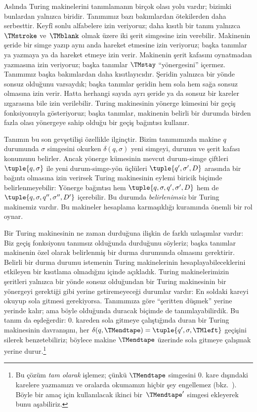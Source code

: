 


Aslında Turing makinelerini tanımlamanın birçok olası yolu vardır; bizimki
bunlardan yalnızca biridir. Tanımımız bazı bakımlardan ötekilerden daha
serbesttir. Keyfî sonlu alfabelere izin veriyoruz; daha kısıtlı bir tanım
yalnızca $\TMstroke$ ve~$\TMblank$ olmak üzere iki şerit simgesine izin
verebilir. Makinenin şeride bir simge yazıp aynı anda hareket etmesine izin
veriyoruz; başka tanımlar ya yazmaya ya da hareket etmeye izin verir.
Makinenin şerit kafasını oynatmadan yazmasına izin veriyoruz; başka tanımlar
$\TMstay$ ``yönergesini'' içermez. Tanımımız başka bakımlardan daha
kısıtlayıcıdır. Şeridin yalnızca bir yönde sonsuz olduğunu varsaydık; başka
tanımlar şeridin hem sola hem sağa sonsuz olmasına izin verir. Hatta herhangi
sayıda ayrı şeride ya da sonsuz bir kareler ızgarasına bile izin verilebilir.
Turing makinesinin yönerge kümesini bir geçiş fonksiyonuyla gösteriyoruz;
başka tanımlar, makinenin belirli bir durumda birden fazla olası yönergeye
sahip olduğu bir geçiş bağıntısı kullanır.

Tanımın bu son gevşetilişi özellikle ilginçtir. Bizim tanımımızda makine
$q$ durumunda $\sigma$ simgesini okurken $\delta(q,\sigma)$ yeni simgeyi,
durumu ve şerit kafası konumunu belirler. Ancak yönerge kümesinin mevcut
durum-simge çiftleri $\tuple{q,\sigma}$ ile yeni durum-simge-yön üçlüleri
$\tuple{q',\sigma',D}$ arasında bir bağıntı olmasına izin verirsek Turing
makinesinin eylemi biricik biçimde belirlenmeyebilir: Yönerge bağıntısı hem
$\tuple{q,\sigma,q',\sigma',D}$ hem de
$\tuple{q,\sigma,q'',\sigma'',D'}$ içerebilir. Bu durumda
\emph{belirlenimsiz} bir Turing makinemiz vardır. Bu makineler hesaplama
karmaşıklığı kuramında önemli bir rol oynar.

Bir Turing makinesinin ne zaman durduğuna ilişkin de farklı uzlaşımlar vardır:
Biz geçiş fonksiyonu tanımsız olduğunda durduğunu söyleriz; başka tanımlar
makinenin özel olarak belirlenmiş bir durma durumunda olmasını gerektirir.
Belirli bir durma durumu istemenin Turing makinelerinin hesaplayabileceklerini
etkileyen bir kısıtlama olmadığını  içinde açıkladık. Turing
makinelerimizin şeritleri yalnızca bir yönde sonsuz olduğundan bir Turing
makinesinin bir yönergeyi gerektiği gibi yerine getiremeyeceği durumlar vardır:
En soldaki kareyi okuyup sola gitmesi gerekiyorsa. Tanımımıza göre ``şeritten
düşmek'' yerine yerinde kalır; ama böyle olduğunda duracak biçimde de
tanımlayabilirdik. Bu tanım da eşdeğerdir: $0$. kareden sola gitmeye
çalıştığında duran bir Turing makinesinin davranışını, her
$\delta(q,\TMendtape)=\tuple{q',\sigma,\TMleft}$ geçişini silerek
benzetebiliriz; böylece makine $\TMendtape$ üzerinde sola gitmeye çalışmak
yerine durur.\footnote{Bu çözüm \emph{tam olarak} işlemez; çünkü
$\TMendtape$ simgesini $0$. kare dışındaki karelere yazmamızı ve oralarda
okumamızı hiçbir şey engellemez (bkz.~). Böyle bir amaç
için kullanılacak ikinci bir~$\TMendtape'$ simgesi ekleyerek bunu aşabiliriz.}

